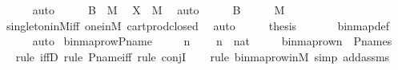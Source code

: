 \begin{isabellebody}
\ \ \ \ \isamarkupfalse%
\ auto\isanewline
\isanewline
\ \ \isamarkupfalse%
\ \isamarkupfalse%
\ {\isachardoublequoteopen}{\isacharquery}{\kern0pt}B\ {\isasymin}\ M{\isachardoublequoteclose}\ \isamarkupfalse%
\ {\isacartoucheopen}X\ {\isasymin}\ M{\isacartoucheclose}\ \isamarkupfalse%
\ auto\isanewline
\ \ \isamarkupfalse%
\ \isamarkupfalse%
\ {\isachardoublequoteopen}{\isacharquery}{\kern0pt}B\ {\isasymtimes}\ {\isacharbraceleft}{\kern0pt}\ {}\ {\isacharbraceright}{\kern0pt}\ {\isasymin}\ M{\isachardoublequoteclose}\ \isamarkupfalse%
\ singleton{\isacharunderscore}{\kern0pt}in{\isacharunderscore}{\kern0pt}M{\isacharunderscore}{\kern0pt}iff\ one{\isacharunderscore}{\kern0pt}in{\isacharunderscore}{\kern0pt}M\ cartprod{\isacharunderscore}{\kern0pt}closed\ \isamarkupfalse%
\ auto\isanewline
\ \ \isamarkupfalse%
\ \isamarkupfalse%
\ {\isacharquery}{\kern0pt}thesis\ \isanewline
\ \ \ \ \isamarkupfalse%
\ binmap{\isacharprime}{\kern0pt}{\isacharunderscore}{\kern0pt}def\isanewline
\ \ \ \ \isamarkupfalse%
\ auto\isanewline
{}\isamarkupfalse%
%
\endisatagproof
{\isafoldproof}%
%
\isadelimproof
\isanewline
%
\endisadelimproof
\isanewline
{}\isamarkupfalse%
\ binmap{\isacharunderscore}{\kern0pt}row{\isacharprime}{\kern0pt}{\isacharunderscore}{\kern0pt}P{\isacharunderscore}{\kern0pt}name\ {\isacharcolon}{\kern0pt}\ \isanewline
\ \ \ n\ \isanewline
\ \ \ {\isachardoublequoteopen}n\ {\isasymin}\ nat{\isachardoublequoteclose}\ \ \isanewline
\ \ \ {\isachardoublequoteopen}binmap{\isacharunderscore}{\kern0pt}row{\isacharprime}{\kern0pt}{\isacharparenleft}{\kern0pt}n{\isacharparenright}{\kern0pt}\ {\isasymin}\ P{\isacharunderscore}{\kern0pt}names{\isachardoublequoteclose}\ \isanewline
%
\isadelimproof
\isanewline
\ \ %
\endisadelimproof
%
\isatagproof
{}\isamarkupfalse%
{\isacharparenleft}{\kern0pt}rule\ iffD{}{\isacharcomma}{\kern0pt}\ rule\ P{\isacharunderscore}{\kern0pt}name{\isacharunderscore}{\kern0pt}iff{\isacharcomma}{\kern0pt}\ rule\ conjI{\isacharparenright}{\kern0pt}\isanewline
\ \ \ \isamarkupfalse%
{\isacharparenleft}{\kern0pt}rule\ binmap{\isacharunderscore}{\kern0pt}row{\isacharprime}{\kern0pt}{\isacharunderscore}{\kern0pt}in{\isacharunderscore}{\kern0pt}M{\isacharcomma}{\kern0pt}\ simp\ add{\isacharcolon}{\kern0pt}assms{\isacharparenright}{\kern0pt}\isanewline

\end{isabellebody}
